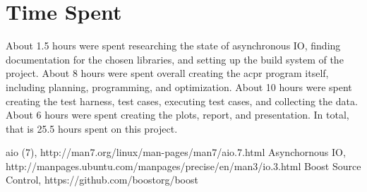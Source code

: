 \documentclass[11pt]{article}
\begin{document}
\section{Time Spent} \label{sec:time}

About 1.5 hours were spent researching the state of asynchronous IO, finding
documentation for the chosen libraries, and setting up the build system of the
project. About 8 hours were spent overall creating the acpr program itself,
including planning, programming, and optimization. About 10 hours were spent
creating the test harness, test cases, executing test cases, and collecting the
data. About 6 hours were spent creating the plots, report, and presentation. In total,
that is 25.5 hours spent on this project.

\begin{thebibliography}{99}
        aio (7), http://man7.org/linux/man-pages/man7/aio.7.html
        Asynchornous IO, http://manpages.ubuntu.com/manpages/precise/en/man3/io.3.html
        Boost Source Control, https://github.com/boostorg/boost
\end{thebibliography}
\end{document}
